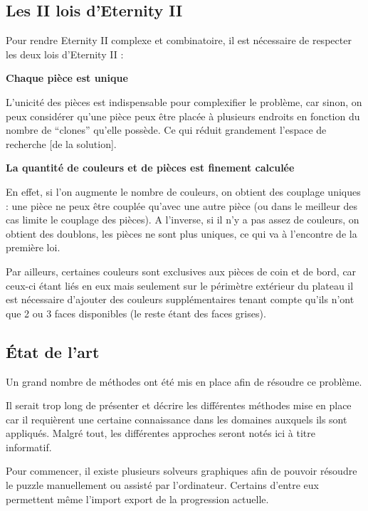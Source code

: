 	\subsection{Les II lois d'Eternity II}
	
	Pour rendre Eternity II complexe et combinatoire, il est nécessaire de respecter les deux lois d'Eternity II :
	
	\begin{law}
		\textbf{Chaque pièce est unique}
		
		L'unicité des pièces est indispensable pour complexifier le problème, car sinon, on peux considérer qu'une pièce peux être placée à plusieurs endroits en fonction du nombre de \enquote{clones} qu'elle possède. Ce qui réduit grandement l'espace de recherche [de la solution].
	\end{law}

	\begin{law}
		\textbf{La quantité de couleurs et de pièces est finement calculée}
		
		En effet, si l'on augmente le nombre de couleurs, on obtient des couplage uniques : une pièce ne peux être couplée qu'avec une autre pièce (ou dans le meilleur des cas limite le couplage des pièces). A l'inverse, si il n'y a pas assez de couleurs, on obtient des doublons, les pièces ne sont plus uniques, ce qui va à l'encontre de la première loi.
		
		Par ailleurs, certaines couleurs sont exclusives aux pièces de coin et de bord, car ceux-ci étant liés en eux mais seulement sur le périmètre extérieur du plateau il est nécessaire d'ajouter des couleurs supplémentaires tenant compte qu'ils n'ont que 2 ou 3 faces disponibles (le reste étant des faces grises).
	\end{law}
	\newpage
	
	\subsection{État de l'art}
	
	Un grand nombre de méthodes ont été mis en place afin de résoudre ce problème.
	
	Il serait trop long de présenter et décrire les différentes méthodes mise en place car il requièrent une certaine connaissance dans les domaines auxquels ils sont appliqués. Malgré tout, les différentes approches seront notés ici à titre informatif.
	
	Pour commencer, il existe plusieurs solveurs graphiques afin de pouvoir résoudre le puzzle manuellement ou assisté par l'ordinateur. Certains d'entre eux permettent même l'import export de la progression actuelle.
	
